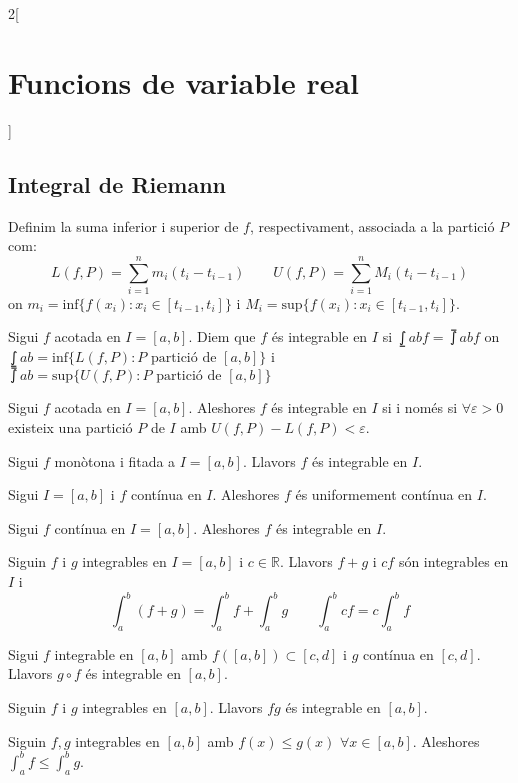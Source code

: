 \documentclass[class=article,10pt,crop=false]{standalone}
\begin{document}
\begin{multicols}{2}[\section{Funcions de variable real}]
\subsection{Integral de Riemann}
\begin{definition}
Definim la suma inferior i superior de $f$, respectivament, associada a la partició $P$ com:
$$L(f,P)=\sum_{i=1}^nm_i(t_i-t_{i-1})\qquad U(f,P)=\sum_{i=1}^nM_i(t_i-t_{i-1})$$
on $m_i=\text{inf}\{f(x_i):x_i\in[t_{i-1},t_i]\}$ i $M_i=\text{sup}\{f(x_i):x_i\in[t_{i-1},t_i]\}$.
\end{definition}
\begin{definition}
Sigui $f$ acotada en $I=[a,b]$. Diem que $f$ és integrable en $I$ si $\lowint{a}{b}f=\upint{a}{b}f$ on $\lowint{a}{b}=\text{inf}\{L(f,P):P \text{ partició de }[a,b]\}$ i $\upint{a}{b}=\text{sup}\{U(f,P):P \text{ partició de }[a,b]\}$
\end{definition}
\begin{lemma}
Sigui $f$ acotada en $I=[a,b]$. Aleshores $f$ és integrable en $I$ si i només si $\forall\varepsilon>0$ existeix una partició $P$ de $I$ amb $U(f,P)-L(f,P)<\varepsilon$.
\end{lemma}
\begin{theorem}
Sigui $f$ monòtona i fitada a $I=[a,b]$. Llavors $f$ és integrable en $I$.
\end{theorem}
\begin{theorem}
Sigui $I=[a,b]$ i $f$ contínua en $I$. Aleshores $f$ és uniformement contínua en $I$.
\end{theorem}
\begin{theorem}
Sigui $f$ contínua en $I=[a,b]$. Aleshores $f$ és integrable en $I$.
\end{theorem}
\begin{prop}
Siguin $f$ i $g$ integrables en $I=[a,b]$ i $c\in\mathbb{R}$. Llavors $f+g$ i $cf$  són integrables en $I$ i $$\int_a^b(f+g)=\int_a^bf+\int_a^bg\qquad \int_a^bcf=c\int_a^bf$$
\end{prop}
\begin{theorem}
Sigui $f$ integrable en $[a,b]$ amb $f([a,b])\subset[c,d]$ i $g$ contínua en $[c,d]$. Llavors $g\circ f$ és integrable en $[a,b]$.
\end{theorem}
\begin{corollary}
Siguin $f$ i $g$ integrables en $[a,b]$. Llavors $fg$ és integrable en $[a,b]$.
\end{corollary}
\begin{prop}
Siguin $f,g$ integrables en $[a,b]$ amb $f(x)\leq g(x)$ $\forall x\in [a,b]$. Aleshores $\int_a^bf\leq\int_a^bg$.

\end{prop}
\end{multicols}
\end{document}
